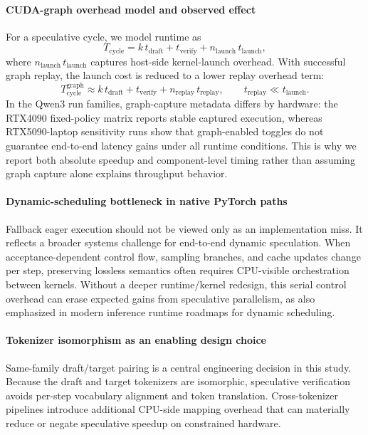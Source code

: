 \paragraph{CUDA-graph overhead model and observed effect}
For a speculative cycle, we model runtime as
\begin{equation}
T_{\text{cycle}} = k\,t_{\text{draft}} + t_{\text{verify}} + n_{\text{launch}}\,t_{\text{launch}},
\end{equation}
where $n_{\text{launch}}\,t_{\text{launch}}$ captures host-side kernel-launch
overhead. With successful graph replay, the launch cost is reduced to a lower
replay overhead term:
\begin{equation}
T^{\text{graph}}_{\text{cycle}} \approx k\,t_{\text{draft}} + t_{\text{verify}} + n_{\text{replay}}\,t_{\text{replay}},
\qquad t_{\text{replay}} \ll t_{\text{launch}}.
\end{equation}
In the Qwen3 run families, graph-capture metadata differs by hardware:
the RTX4090 fixed-policy matrix reports stable captured execution, whereas
RTX5090-laptop sensitivity runs show that graph-enabled toggles do not
guarantee end-to-end latency gains under all runtime conditions. This is why
we report both absolute speedup and component-level timing rather than
assuming graph capture alone explains throughput behavior.

\paragraph{Dynamic-scheduling bottleneck in native PyTorch paths}
Fallback eager execution should not be viewed only as an implementation miss.
It reflects a broader systems challenge for end-to-end dynamic speculation.
When acceptance-dependent control flow, sampling branches, and cache updates
change per step, preserving lossless semantics often requires CPU-visible
orchestration between kernels. Without a deeper runtime/kernel redesign, this
serial control overhead can erase expected gains from speculative parallelism,
as also emphasized in modern inference runtime roadmaps for dynamic
scheduling.

\paragraph{Tokenizer isomorphism as an enabling design choice}
Same-family draft/target pairing is a central engineering decision in this
study. Because the draft and target tokenizers are isomorphic, speculative
verification avoids per-step vocabulary alignment and token translation.
Cross-tokenizer pipelines introduce additional CPU-side mapping overhead that
can materially reduce or negate speculative speedup on constrained hardware.

